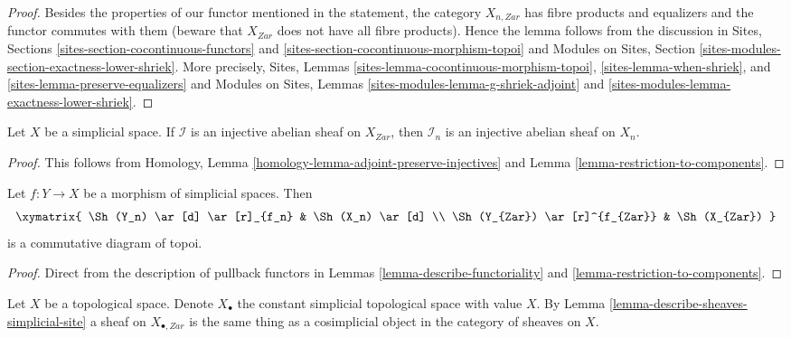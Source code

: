 \begin{proof}
Besides the properties of our functor mentioned in the statement,
the category $X_{n, Zar}$ has fibre products and equalizers
and the functor commutes with them (beware that $X_{Zar}$ does not
have all fibre products). Hence the lemma follows from the discussion in
Sites, Sections \ref{sites-section-cocontinuous-functors} and
\ref{sites-section-cocontinuous-morphism-topoi}
and
Modules on Sites, Section \ref{sites-modules-section-exactness-lower-shriek}.
More precisely,
Sites, Lemmas \ref{sites-lemma-cocontinuous-morphism-topoi},
\ref{sites-lemma-when-shriek}, and
\ref{sites-lemma-preserve-equalizers}
and
Modules on Sites, Lemmas
\ref{sites-modules-lemma-g-shriek-adjoint} and
\ref{sites-modules-lemma-exactness-lower-shriek}.
\end{proof}

\begin{lemma}
\label{lemma-restriction-injective-to-component}
Let $X$ be a simplicial space. If $\mathcal{I}$ is an injective abelian
sheaf on $X_{Zar}$, then $\mathcal{I}_n$ is an injective abelian sheaf
on $X_n$.
\end{lemma}

\begin{proof}
This follows from
Homology, Lemma \ref{homology-lemma-adjoint-preserve-injectives}
and
Lemma \ref{lemma-restriction-to-components}.
\end{proof}

\begin{lemma}
\label{lemma-restriction-to-components-functorial}
Let $f : Y \to X$ be a morphism of simplicial spaces. Then
$$
\xymatrix{
\Sh(Y_n) \ar[d] \ar[r]_{f_n} & \Sh(X_n) \ar[d] \\
\Sh(Y_{Zar}) \ar[r]^{f_{Zar}} & \Sh(X_{Zar})
}
$$
is a commutative diagram of topoi.
\end{lemma}

\begin{proof}
Direct from the description of pullback functors in
Lemmas \ref{lemma-describe-functoriality} and
\ref{lemma-restriction-to-components}.
\end{proof}

\noindent
Let $X$ be a topological space. Denote $X_\bullet$ the constant simplicial
topological space with value $X$. By
Lemma \ref{lemma-describe-sheaves-simplicial-site}
a sheaf on $X_{\bullet, Zar}$ is the same
thing as a cosimplicial object in the category of sheaves on $X$.

